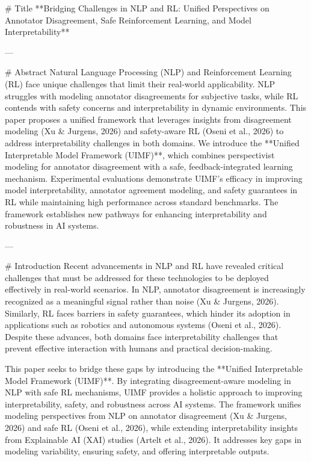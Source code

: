 # Title  
**Bridging Challenges in NLP and RL: Unified Perspectives on Annotator Disagreement, Safe Reinforcement Learning, and Model Interpretability**

---

# Abstract  
Natural Language Processing (NLP) and Reinforcement Learning (RL) face unique challenges that limit their real-world applicability. NLP struggles with modeling annotator disagreements for subjective tasks, while RL contends with safety concerns and interpretability in dynamic environments. This paper proposes a unified framework that leverages insights from disagreement modeling (Xu & Jurgens, 2026) and safety-aware RL (Oseni et al., 2026) to address interpretability challenges in both domains. We introduce the **Unified Interpretable Model Framework (UIMF)**, which combines perspectivist modeling for annotator disagreement with a safe, feedback-integrated learning mechanism. Experimental evaluations demonstrate UIMF's efficacy in improving model interpretability, annotator agreement modeling, and safety guarantees in RL while maintaining high performance across standard benchmarks. The framework establishes new pathways for enhancing interpretability and robustness in AI systems.

---

# Introduction  
Recent advancements in NLP and RL have revealed critical challenges that must be addressed for these technologies to be deployed effectively in real-world scenarios. In NLP, annotator disagreement is increasingly recognized as a meaningful signal rather than noise (Xu & Jurgens, 2026). Similarly, RL faces barriers in safety guarantees, which hinder its adoption in applications such as robotics and autonomous systems (Oseni et al., 2026). Despite these advances, both domains face interpretability challenges that prevent effective interaction with humans and practical decision-making.

This paper seeks to bridge these gaps by introducing the **Unified Interpretable Model Framework (UIMF)**. By integrating disagreement-aware modeling in NLP with safe RL mechanisms, UIMF provides a holistic approach to improving interpretability, safety, and robustness across AI systems. The framework unifies modeling perspectives from NLP on annotator disagreement (Xu & Jurgens, 2026) and safe RL (Oseni et al., 2026), while extending interpretability insights from Explainable AI (XAI) studies (Artelt et al., 2026). It addresses key gaps in modeling variability, ensuring safety, and offering interpretable outputs.

